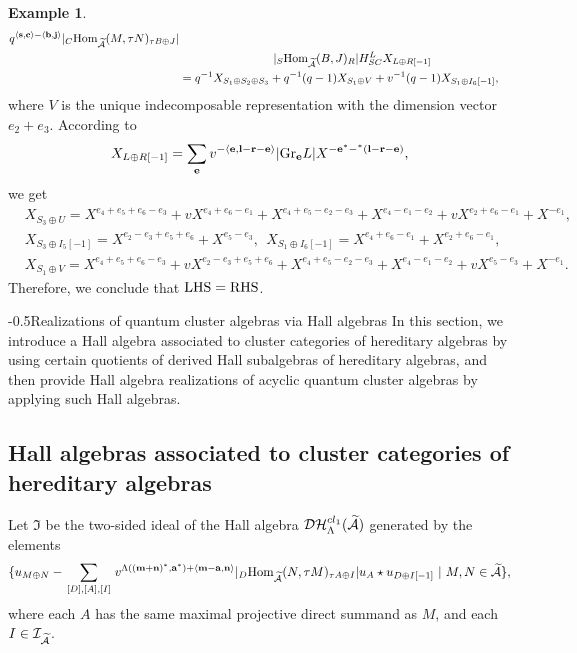 \documentclass[reqno,12pt]{amsart}
\makeatletter
\numberwithin{equation}{section}
\def\lr#1{\langle #1\rangle} \def\fin{\hfill$\square$}  \def\lra{\longrightarrow} \def\mod{\mbox{\rm \textbf{mod}}\,}\def\Mod{\mbox{\rm mod}\,}\def\top{\mbox{\rm top}\,}\def\soc{\mbox{\rm soc}\,}
\theoremstyle{plain} %
\theoremstyle{definition} %
\newtheorem{example}[theorem]{\bf Example}
\renewcommand{\section}{\@startsection{section}{1}{0mm}
  {-\baselineskip}{0.5\baselineskip}{\bf\leftline}}
\makeatother
\begin{document}
\begin{example}
\begin{align*}
q^{\lr{{\bf s},{\bf c}}-\lr{{\bf b},{\bf j}}}|_C\Hom_{\widetilde{\A}}(M,\tau N)_{\tau B\oplus J}|\\&\quad\quad\quad\quad\quad\quad\quad\quad|{_S\Hom_{\widetilde{\A}}(B,J)_{R}}|H_{SC}^LX_{L\oplus R[-1]}\\
&=q^{-1}X_{S_1\oplus S_2\oplus S_3}+q^{-1}(q-1)X_{S_1\oplus V}+v^{-1}(q-1)X_{S_1\oplus I_6[-1]},
    \end{align*}
   where $V$ is the unique indecomposable representation with the dimension vector $e_2+e_3$.  According to
   \begin{align*}
       X_{L\oplus R[-1]}=\sum\limits_{\bf e}v^{-\lr{\mathbf{e},{\bf l}-{\bf r}-\mathbf{e}}}|\mathrm{Gr}_{\mathbf{e}}L|
X^{-\mathbf{e}^\ast-^\ast(\mathbf{l}-\mathbf{r}-\mathbf{e})},
\end{align*}
  we get
  \begin{align*}
  &X_{S_3\oplus U}=X^{e_4+e_5+e_6-e_3}+vX^{e_4+e_6-e_1}+X^{e_4+e_5-e_2-e_3}+X^{e_4-e_1-e_2}
     +vX^{e_2+e_6-e_1}+X^{-e_1},\\
     & X_{S_3\oplus I_5[-1]}=X^{e_2-e_3+e_5+e_6}+X^{e_5-e_3},~~X_{S_1\oplus I_6[-1]}=X^{e_4+e_6-e_1}+X^{e_2+e_6-e_1},\\
     & X_{S_1\oplus V}=X^{e_4+e_5+e_6-e_3}+vX^{e_2-e_3+e_5+e_6}+X^{e_4+e_5-e_2-e_3}+X^{e_4-e_1-e_2}+vX^{e_5-e_3}+X^{-e_1}.
\end{align*}
Therefore, we conclude that ${\rm LHS}={\rm RHS}$.
\end{example}



\section{Realizations of quantum cluster algebras via Hall algebras}
In this section, we introduce a Hall algebra associated to cluster categories of hereditary algebras
by using certain quotients of derived Hall subalgebras of hereditary algebras, and then provide Hall algebra realizations of acyclic quantum cluster algebras by applying such Hall algebras.
\subsection{Hall algebras associated to cluster categories of hereditary algebras}
Let $\mathfrak{I}$ be the two-sided ideal of the Hall algebra $\mathcal {D}\mathcal {H}_\Lambda^{{cl}_1}(\widetilde{\mathcal{A}})$ generated by the elements $$\{u_{M\oplus N}-\sum\limits_{\begin{smallmatrix}[D],[A],[I]\end{smallmatrix}}v^{\Lambda(({\bf m}+{\bf n})^*,{\bf a}^*)+\lr{{\bf m}-{\bf a},{\bf n}}}|_D\Hom_{\widetilde{\A}}(N,\tau M)_{\tau A\oplus I}|u_{A}\star u_{D\oplus I[-1]}~|~M,N\in{\widetilde{\A}}\},$$
where each $A$ has the same maximal projective direct summand as $M$, and each $I\in\mathcal{I}_{\widetilde{\mathcal{A}}}$.
\end{document}
